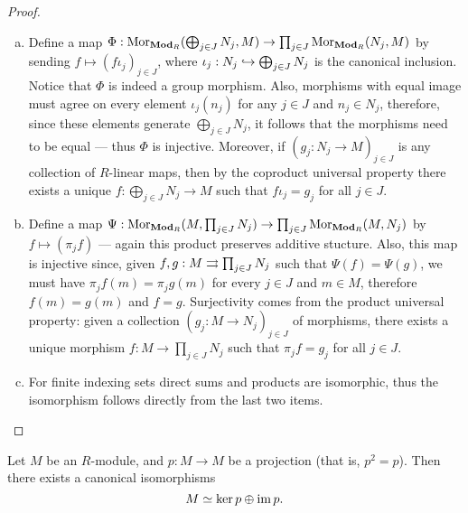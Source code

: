\begin{proof}
\begin{enumerate}[(a)]\setlength\itemsep{0em}
\item Define a map
  \(\Phi: \operatorname{Mor}_{{\textbf{Mod}_{R}}}(\bigoplus_{j \in J} N_j, M) \to \prod_{j \in J}
  \operatorname{Mor}_{{\textbf{Mod}_{R}}}(N_j, M)\) by sending \(f \mapsto (f \iota_j)_{j \in J}\),
  where \(\iota_j: N_j \hookrightarrow \bigoplus_{j \in J} N_j\) is the canonical
  inclusion. Notice that \(\Phi\) is indeed a group morphism. Also, morphisms
  with equal image must agree on every element \(\iota_j(n_j)\) for any
  \(j \in J\) and \(n_j \in N_j\), therefore, since these elements generate
  \(\bigoplus_{j \in J} N_j\), it follows that the morphisms need to be equal
  --- thus \(\Phi\) is injective. Moreover, if \((g_j: N_j \to M)_{j \in J}\) is
  any collection of \(R\)-linear maps, then by the coproduct universal property
  there exists a unique \(f: \bigoplus_{j \in J} N_j \to M\) such that
  \(f \iota_j = g_j\) for all \(j \in J\).

\item Define a map
  \(\Psi: \operatorname{Mor}_{{\textbf{Mod}_{R}}}(M, \prod_{j \in J} N_j) \to \prod_{j \in J}
  \operatorname{Mor}_{{\textbf{Mod}_{R}}}(M, N_j)\) by \(f \mapsto (\pi_j f)\) --- again
  this product preserves additive stucture. Also, this map is injective since,
  given \(f, g: M \rightrightarrows \prod_{j \in J} N_j\) such that \(\Psi(f) = \Psi(g)\),
  we must have \(\pi_j f(m) = \pi_j g(m)\) for every \(j \in J\) and
  \(m \in M\), therefore \(f(m) = g(m)\) and \(f = g\). Surjectivity comes from
  the product universal property: given a collection
  \((g_j: M \to N_j)_{j \in J}\) of morphisms, there exists a unique morphism
  \(f: M \to \prod_{j \in J} N_j\) such that \(\pi_j f = g_j\) for all
  \(j \in J\).

\item For finite indexing sets direct sums and products are isomorphic, thus the
  isomorphism follows directly from the last two items.
\end{enumerate}
\end{proof}

\begin{lemma}
\label{lem:module-iso-ker-im}
Let \(M\) be an \(R\)-module, and \(p: M \to M\) be a projection (that is,
\(p^2 = p\)). Then there exists a canonical isomorphisms
\[
M \simeq \ker p \oplus \operatorname{im} p .
\]
\end{lemma}

